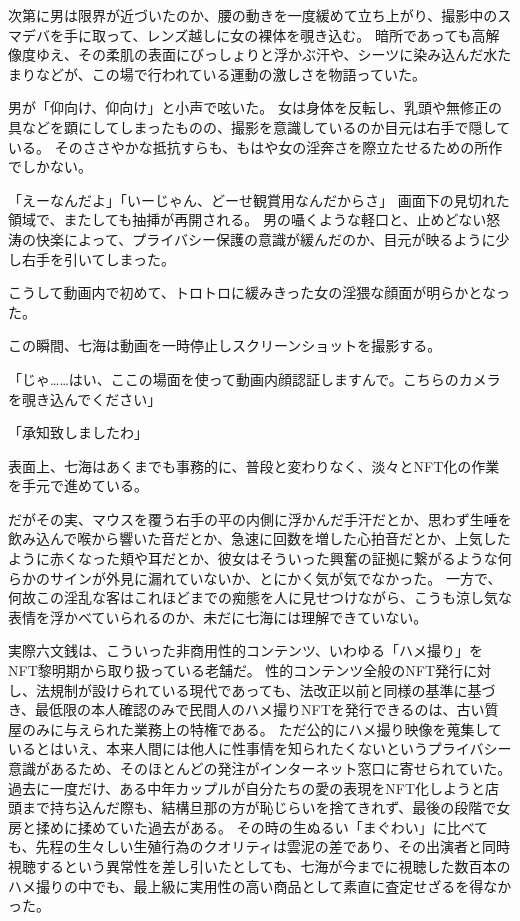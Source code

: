 次第に男は限界が近づいたのか、腰の動きを一度緩めて立ち上がり、撮影中のスマデバを手に取って、レンズ越しに女の裸体を覗き込む。
暗所であっても高解像度ゆえ、その柔肌の表面にびっしょりと浮かぶ汗や、シーツに染み込んだ水たまりなどが、この場で行われている運動の激しさを物語っていた。

男が「仰向け、仰向け」と小声で呟いた。
女は身体を反転し、乳頭や無修正の具などを顕にしてしまったものの、撮影を意識しているのか目元は右手で隠している。
そのささやかな抵抗すらも、もはや女の淫奔さを際立たせるための所作でしかない。

「えーなんだよ」「いーじゃん、どーせ観賞用なんだからさ」
画面下の見切れた領域で、またしても抽挿が再開される。
男の囁くような軽口と、止めどない怒涛の快楽によって、プライバシー保護の意識が緩んだのか、目元が映るように少し右手を引いてしまった。

こうして動画内で初めて、トロトロに緩みきった女の淫猥な顔面が明らかとなった。

\sectionbreak

この瞬間、七海は動画を一時停止しスクリーンショットを撮影する。

「じゃ……はい、ここの場面を使って動画内顔認証しますんで。こちらのカメラを覗き込んでください」

「承知致しましたわ」

表面上、七海はあくまでも事務的に、普段と変わりなく、淡々とNFT化の作業を手元で進めている。

だがその実、マウスを覆う右手の平の内側に浮かんだ手汗だとか、思わず生唾を飲み込んで喉から響いた音だとか、急速に回数を増した心拍音だとか、上気したように赤くなった頬や耳だとか、彼女はそういった興奮の証拠に繋がるような何らかのサインが外見に漏れていないか、とにかく気が気でなかった。
一方で、何故この淫乱な客はこれほどまでの痴態を人に見せつけながら、こうも涼し気な表情を浮かべていられるのか、未だに七海には理解できていない。

実際六文銭は、こういった非商用性的コンテンツ、いわゆる「ハメ撮り」をNFT黎明期から取り扱っている老舗だ。
性的コンテンツ全般のNFT発行に対し、法規制が設けられている現代であっても、法改正以前と同様の基準に基づき、最低限の本人確認のみで民間人のハメ撮りNFTを発行できるのは、古い質屋のみに与えられた業務上の特権である。
ただ公的にハメ撮り映像を蒐集しているとはいえ、本来人間には他人に性事情を知られたくないというプライバシー意識があるため、そのほとんどの発注がインターネット窓口に寄せられていた。
過去に一度だけ、ある中年カップルが自分たちの愛の表現をNFT化しようと店頭まで持ち込んだ際も、結構旦那の方が恥じらいを捨てきれず、最後の段階で女房と揉めに揉めていた過去がある。
その時の生ぬるい「まぐわい」に比べても、先程の生々しい生殖行為のクオリティは雲泥の差であり、その出演者と同時視聴するという異常性を差し引いたとしても、七海が今までに視聴した数百本のハメ撮りの中でも、最上級に実用性の高い商品として素直に査定せざるを得なかった。


